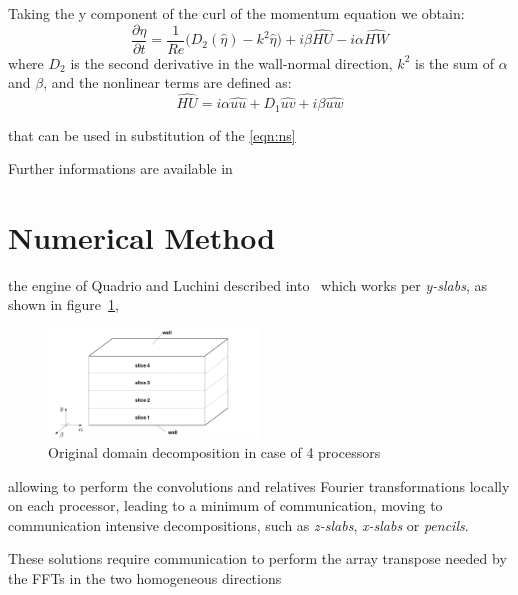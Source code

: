 Taking the y component of the curl of the momentum equation we obtain:
\begin{equation}
\frac{\partial \hat{\eta}}{\partial t}  = \frac{1}{Re}  \big( D_{2}(\hat{\eta}) - k^{2} \hat{\eta} \big) + i \beta \widehat{HU} -i \alpha \widehat{HW}
\end{equation}
where $D_{2}$ is the second derivative in the wall-normal direction, $k^{2}$ is the sum of $\alpha$ and $\beta$, and the nonlinear terms are defined as:
\begin{subequations}
\widehat{HU} = i \alpha \widehat{uu} + D_{1} \widehat{uv} + i \beta \widehat{uw}

\end{subequations}


 that can be used in substitution of the \eqref{eqn:ns}

Further informations are available in \cite{cpl:presentazione}






\section{Numerical Method}
the engine of Quadrio and Luchini described into~\cite{cpl:presentazione} which works per \emph{y-slabs}, as shown in figure~\ref{domain_decomp},
\begin{figure}
\centering
\includegraphics[width=0.5\textwidth]{grafici/decomp_dominio_cpl}
\caption{Original domain decomposition in case of 4 processors}
\label{domain_decomp}
\end{figure} allowing to perform the convolutions and relatives Fourier transformations locally on each processor, leading to a minimum of communication, moving to communication intensive decompositions, such as \emph{z-slabs}, \emph{x-slabs} or \emph{pencils}.

These solutions require communication to perform the array transpose needed by the FFTs in the two homogeneous directions